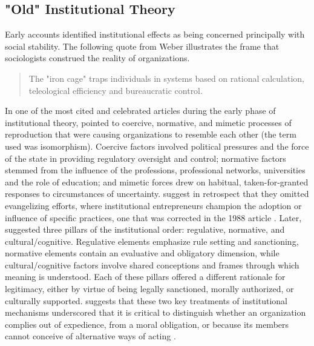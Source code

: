 \documentclass[12pt]{article}
\begin{document}
\subsection{"Old" Institutional Theory}
Early accounts identified institutional effects as being concerned principally with social stability. The following quote from Weber illustrates the frame that sociologists construed the reality of organizations.
\begin{quotation} 
The "iron cage" traps individuals in systems based on rational calculation, teleological efficiency and bureaucratic control.\\ 
\null\hfill \textit{\cite{Weber2002}}
\end{quotation}

In one of the most cited and celebrated articles during the early phase of institutional theory, \cite{Dimaggio1983} pointed to coercive, normative, and mimetic processes of reproduction that were causing organizations to resemble each other (the term used was isomorphism). Coercive factors involved political pressures and the force of the state in providing regulatory oversight and control; normative factors stemmed from the  influence of the professions, professional networks, universities and the role of education; and mimetic forces drew on habitual, taken-for-granted responses to circumstances of uncertainty. \cite{Powell2007} suggest in retrospect that they omitted evangelizing efforts, where institutional entrepreneurs champion the adoption or influence of specific practices, one that was corrected in the 1988 article \citep{Dimaggio1988}. Later, \cite{Scott1995} suggested three pillars of the institutional order: regulative, normative, and cultural/cognitive. Regulative elements emphasize rule setting and sanctioning, normative elements contain an evaluative and obligatory dimension, while cultural/cognitive factors involve shared conceptions and frames through which meaning is understood. Each of these pillars offered a different rationale for legitimacy, either by virtue of being legally sanctioned, morally authorized, or culturally supported. \cite{Powell2007} suggests that these two key treatments of institutional mechanisms underscored that it is critical to distinguish whether an organization complies out of expedience, from a moral obligation, or because its members cannot conceive of alternative ways of acting \citep{Powell2007}.
\end{document}

